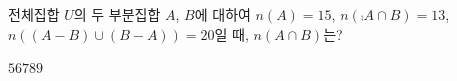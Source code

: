전체집합 $U$의 두 부분집합 $A$, $B$에 대하여 $n(A)=15$, $n(\comp{A}\cap B)=13$, $n((A-B)\cup(B-A))=20$일 때, $n(A\cap B)$는?
\begin{choices32}{$5$}{$6$}{$7$}{$8$}{$9$}\end{choices32}

